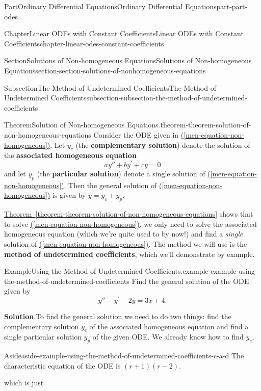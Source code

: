 \documentclass[twoside,10pt,]{book}
\newcommand{\blocktitlefont}{\relax}
\newcommand{\xreffont}{\relax}
\newcommand{\terminology}[1]{\textbf{#1}}
\numberwithin{equation}{part}
\begin{document}
\begin{partptx}{Part}{Ordinary Differential Equations}{}{Ordinary Differential Equations}{}{}{part-part-odes}
\begin{chapterptx}{Chapter}{Linear ODEs with Constant Coefficients}{}{Linear ODEs with Constant Coefficients}{}{}{chapter-linear-odes-constant-coefficients}
\begin{sectionptx}{Section}{Solutions of Non-homogeneous Equations}{}{Solutions of Non-homogeneous Equations}{}{}{section-section-solutions-of-nonhomogeneous-equations}
\begin{subsectionptx}{Subsection}{The Method of Undetermined Coefficients}{}{The Method of Undetermined Coefficients}{}{}{subsection-subsection-the-method-of-undetermined-coefficients}
\begin{theorem}{Theorem}{Solution of Non-homogeneous Equations.}{}{theorem-theorem-solution-of-non-homogeneous-equations}%
Consider the ODE given in \hyperref[men-equation-non-homogeneous]{({\xreffont\ref{men-equation-non-homogeneous}})}. Let \(y_{c}\) (the \terminology{complementary solution}) denote the solution of the \terminology{associated homogeneous equation}%
\begin{equation*}
ay'' + by^\prime + cy = 0
\end{equation*}
and let \(y_{p}\) (the \terminology{particular solution}) denote a single solution of \hyperref[men-equation-non-homogeneous]{({\xreffont\ref{men-equation-non-homogeneous}})}. Then the general solution of \hyperref[men-equation-non-homogeneous]{({\xreffont\ref{men-equation-non-homogeneous}})} is given by \(y = y_{c} + y_{p}\).%
\end{theorem}
\hyperref[theorem-theorem-solution-of-non-homogeneous-equations]{Theorem~{\xreffont\ref{theorem-theorem-solution-of-non-homogeneous-equations}}} shows that to solve \hyperref[men-equation-non-homogeneous]{({\xreffont\ref{men-equation-non-homogeneous}})}, we only need to solve the associated homogeneous equation (which we're quite used to by now!) and find a \emph{single} solution of \hyperref[men-equation-non-homogeneous]{({\xreffont\ref{men-equation-non-homogeneous}})}. The method we will use is the \terminology{method of undetermined coefficients}, which we'll demonstrate by example.%
\begin{example}{Example}{Using the Method of Undetermined Coefficients.}{example-example-using-the-method-of-undetermined-coefficients}%
Find the general solution of the ODE given by%
\begin{equation*}
y'' - y^\prime - 2y = 3x + 4.
\end{equation*}
%
\par\smallskip%
\noindent\textbf{\blocktitlefont Solution}.\hypertarget{solution-example-using-the-method-of-undetermined-coefficients-c}{}\quad{}To find the general solution we need to do two things: find the complementary solution \(y_{c}\) of the associated homogeneous equation and find a single particular solution \(y_{p}\) of the given ODE. We already know how to find \(y_{c},\)\begin{aside}{Aside}{}{aside-example-using-the-method-of-undetermined-coefficients-c-a-d}%
The characteristic equation of the ODE is \((r + 1)(r - 2)\).%
\end{aside}
 which is just%
\begin{equation*}

\end{equation*}
\end{example}
\end{subsectionptx}
\end{sectionptx}
\end{chapterptx}
\end{partptx}
\end{document}
